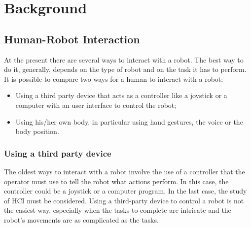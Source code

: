 \documentclass[../thesis.tex]{subfiles}
\begin{document}
\chapter{Background}\label{cap:background}

\section{Human-Robot Interaction}
At the present there are several ways to interact with a robot. The best way to do it, generally, depends on the type of robot and on the task it has to perform. It is possible to compare two ways for a human to interact with a robot:
\begin{itemize}
    \item Using a third party device that acts as a controller like a joystick or a computer with an user interface to control the robot;
    \item Using his/her own body, in particular using hand gestures, the voice or the body position.
\end{itemize}
\subsection{Using a third party device}
The oldest ways to interact with a robot involve the use of a controller that the operator must use to tell the robot what actions perform. In this case, the controller could be a joystick or a computer program. In the last case, the study of \acrfull{HCI} must be considered. Using a third-party device to control a robot is not the easiest way, especially when the tasks to complete are intricate and the robot's movements are as complicated as the tasks.  
\end{document}
